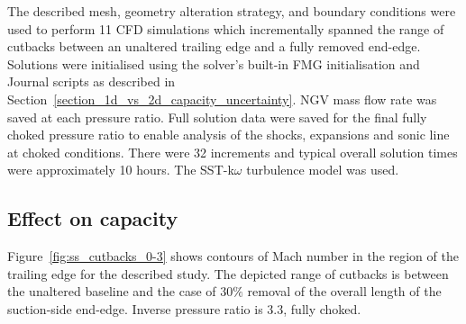 \documentclass[a4paper, 11pt, oneside]{report}
\begin{document}
The described mesh, geometry alteration strategy, and boundary conditions were used to perform 11 CFD simulations which incrementally spanned the range of cutbacks between an unaltered trailing edge and a fully removed end-edge. Solutions were initialised using the solver's built-in FMG initialisation and Journal scripts as described in Section~\ref{section_1d_vs_2d_capacity_uncertainty}. NGV mass flow rate was saved at each pressure ratio. Full solution data were saved for the final fully choked pressure ratio to enable analysis of the shocks, expansions and sonic line at choked conditions. There were 32 increments and typical overall solution times were approximately 10 hours. The SST-k$\omega$ turbulence model was used.

\subsection{Effect on capacity}

Figure~\ref{fig:ss_cutbacks_0-3} shows contours of Mach number in the region of the trailing edge for the described study. The depicted range of cutbacks is between the unaltered baseline and the case of $30\%$ removal of the overall length of the suction-side end-edge. Inverse pressure ratio is $3.3$, fully choked.
\end{document}
